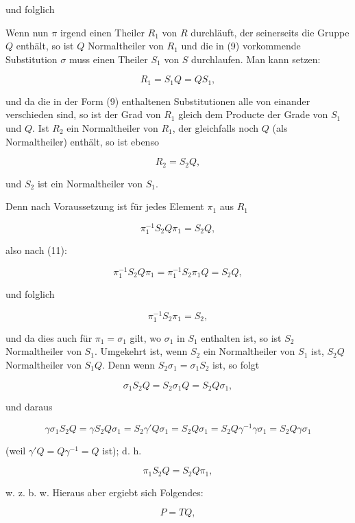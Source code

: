 und folglich


Wenn nun $\pi$ irgend einen Theiler $R_1$ von $R$ durchläuft, der seinerseits die Gruppe $Q$ enthält, so ist $Q$ Normaltheiler von $R_1$ und die in (9) vorkommende Substitution $\sigma$ muss einen Theiler $S_1$ von $S$ durchlaufen. Man kann setzen:

\[
R_1 = S_1 Q = Q S_1,
\]

und da die in der Form (9) enthaltenen Substitutionen alle von einander verschieden sind, so ist der Grad von $R_1$ gleich dem Producte der Grade von $S_1$ und $Q$. Ist $R_2$ ein Normaltheiler von $R_1$, der gleichfalls noch $Q$ (als Normaltheiler) enthält, so ist ebenso

\[
R_2 = S_2 Q,
\]

und $S_2$ ist ein Normaltheiler von $S_1$.

Denn nach Voraussetzung ist für jedes Element $\pi_1$ aus $R_1$

\[
\pi_1^{-1}S_2 Q \pi_1 = S_2 Q,
\]

also nach (11):

\[
\pi_1^{-1}S_2 Q \pi_1 = \pi_1^{-1}S_2\pi_1 Q = S_2 Q,
\]

und folglich

\[
\pi_1^{-1}S_2\pi_1 = S_2,
\]

und da dies auch für $\pi_1 = \sigma_1$ gilt, wo $\sigma_1$ in $S_1$ enthalten ist, so ist $S_2$ Normaltheiler von $S_1$. Umgekehrt ist, wenn $S_2$ ein Normaltheiler von $S_1$ ist, $S_2 Q$ Normaltheiler von $S_1 Q$. Denn wenn $S_2\sigma_1 = \sigma_1 S_2$ ist, so folgt

\[
\sigma_1 S_2 Q = S_2\sigma_1 Q = S_2 Q\sigma_1,
\]

und daraus

\[
\gamma\sigma_1 S_2 Q = \gamma S_2 Q\sigma_1 = S_2\gamma' Q\sigma_1 = S_2 Q\sigma_1 = S_2 Q\gamma^{-1}\gamma\sigma_1 = S_2 Q\gamma\sigma_1
\]

(weil $\gamma' Q = Q\gamma^{-1} = Q$ ist); d. h.

\[
\pi_1 S_2 Q = S_2 Q\pi_1,
\]

w. z. b. w. Hieraus aber ergiebt sich Folgendes:


\[
P = TQ,
\]


